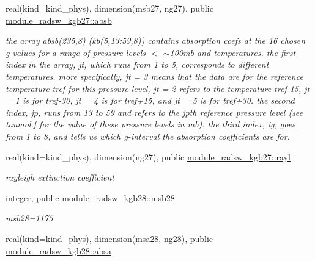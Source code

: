 \begin{Indent}
\begin{DoxyCompactItemize}
real(kind=kind\+\_\+phys), dimension(msb27, ng27), public \hyperlink{group__module__radsw__kgbnn_ga8edb349c908e6950e0d18f293dd1b6ea}{module\+\_\+radsw\+\_\+kgb27\+::absb}
\begin{DoxyCompactList}\small\item\em the array absb(235,8) (kb(5,13\+:59,8)) contains absorption coefs at the 16 chosen g-\/values for a range of pressure levels $<$ $\sim$100mb and temperatures. the first index in the array, jt, which runs from 1 to 5, corresponds to different temperatures. more specifically, jt = 3 means that the data are for the reference temperature tref for this pressure level, jt = 2 refers to the temperature tref-\/15, jt = 1 is for tref-\/30, jt = 4 is for tref+15, and jt = 5 is for tref+30. the second index, jp, runs from 13 to 59 and refers to the jpth reference pressure level (see taumol.\+f for the value of these pressure levels in mb). the third index, ig, goes from 1 to 8, and tells us which g-\/interval the absorption coefficients are for. \end{DoxyCompactList}\item 
real(kind=kind\+\_\+phys), dimension(ng27), public \hyperlink{group__module__radsw__kgbnn_gaca4c6e06d1cd46568048a035c6726f1d}{module\+\_\+radsw\+\_\+kgb27\+::rayl}
\begin{DoxyCompactList}\small\item\em rayleigh extinction coefficient \end{DoxyCompactList}\item 
integer, public \hyperlink{group__module__radsw__kgbnn_ga55d73e39264b431135c6a9c809e20a94}{module\+\_\+radsw\+\_\+kgb28\+::msb28}
\begin{DoxyCompactList}\small\item\em msb28=1175 \end{DoxyCompactList}\item 
real(kind=kind\+\_\+phys), dimension(msa28, ng28), public \hyperlink{group__module__radsw__kgbnn_ga5e48daf035b3b22b6e1b0f36aabcec10}{module\+\_\+radsw\+\_\+kgb28\+::absa}

\end{DoxyCompactItemize}
\end{Indent}
